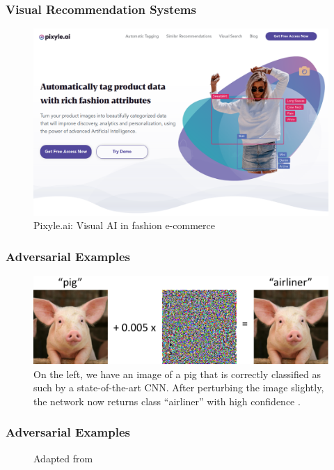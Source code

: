 \documentclass{beamer}
\begin{document}
	\begin{frame}
		\frametitle{Visual Recommendation Systems}
		\begin{figure}[H]
			\centering
			\includegraphics[width=\textwidth]{images/pixyle}
			\caption{Pixyle.ai: Visual AI in fashion e-commerce}
			\label{fig:visual-rs}
		\end{figure}
	\end{frame}
	
	\begin{frame}
		\frametitle{Adversarial Examples}
		\begin{figure}[H]
			\centering
			\includegraphics[width=\textwidth]{../thesis/images/piggie}
			\caption{On the left, we have an image of a pig that is correctly classified as such by a state-of-the-art CNN. After perturbing the image slightly, the network now returns class “airliner” with high confidence \parencite{mit2018adv}.}
			\label{fig:adv}
		\end{figure}
	\end{frame}
	
	\begin{frame}
		\frametitle{Adversarial Examples}
		\begin{figure}[H]
			\centering
			\hspace{0.5cm}
			\hspace{0.5cm}
			\caption{Adapted from \cite{madry2017towards}}
			\label{fig:adv-boundary}
		\end{figure}
	\end{frame}
	
\end{document}
